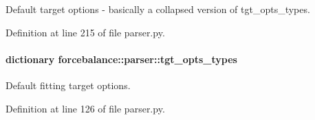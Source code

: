 \-Default target options -\/ basically a collapsed version of tgt\-\_\-opts\-\_\-types. 



\-Definition at line 215 of file parser.\-py.

\hypertarget{namespaceforcebalance_1_1parser_a1725a6ea3c588046339f9476f3e3f32e}{
\paragraph[{tgt\-\_\-opts\-\_\-types}]{\setlength{\rightskip}{0pt plus 5cm}dictionary {\bf forcebalance\-::parser\-::tgt\-\_\-opts\-\_\-types}}}\label{namespaceforcebalance_1_1parser_a1725a6ea3c588046339f9476f3e3f32e}


\-Default fitting target options. 



\-Definition at line 126 of file parser.\-py.

